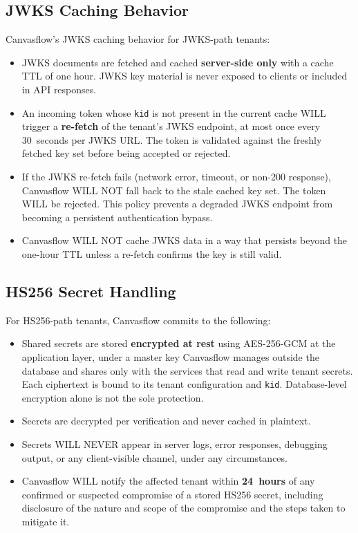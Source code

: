 \subsection{JWKS Caching Behavior}

Canvasflow's JWKS caching behavior for JWKS-path tenants:

\begin{itemize}
  \item JWKS documents are fetched and cached \textbf{server-side only} with a cache TTL
    of one hour. JWKS key material is never exposed to clients or included in API
    responses.

  \item An incoming token whose \texttt{kid} is not present in the current cache WILL
    trigger a \textbf{re-fetch} of the tenant's JWKS endpoint, at most once every
    30~seconds per JWKS URL. The token is validated against the freshly fetched key set
    before being accepted or rejected.

  \item If the JWKS re-fetch fails (network error, timeout, or non-200 response),
    Canvasflow WILL NOT fall back to the stale cached key set. The token WILL be
    rejected. This policy prevents a degraded JWKS endpoint from becoming a persistent
    authentication bypass.

  \item Canvasflow WILL NOT cache JWKS data in a way that persists beyond the one-hour
    TTL unless a re-fetch confirms the key is still valid.
\end{itemize}

\subsection{HS256 Secret Handling}

For HS256-path tenants, Canvasflow commits to the following:

\begin{itemize}
  \item Shared secrets are stored \textbf{encrypted at rest} using AES-256-GCM at the
    application layer, under a master key Canvasflow manages outside the database and
    shares only with the services that read and write tenant secrets. Each ciphertext is
    bound to its tenant configuration and \texttt{kid}. Database-level encryption alone
    is not the sole protection.

  \item Secrets are decrypted per verification and never cached in plaintext.

  \item Secrets WILL NEVER appear in server logs, error responses, debugging output, or
    any client-visible channel, under any circumstances.

  \item Canvasflow WILL notify the affected tenant within \textbf{24~hours} of any
    confirmed or suspected compromise of a stored HS256 secret, including disclosure of
    the nature and scope of the compromise and the steps taken to mitigate it.
\end{itemize}

